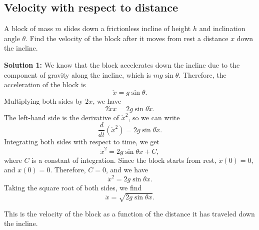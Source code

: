 \documentclass[12pt]{article}
\begin{document}
\subsection{Velocity with respect to distance}
A block of mass $m$ slides down a frictionless incline of height $h$ and inclination angle $\theta$. Find the velocity of the block after it moves from rest a distance $x$ down the incline.

\textbf{Solution 1:}
We know that the block accelerates down the incline due to the component of gravity along the incline, which is $mg\sin\theta$. Therefore, the acceleration of the block is
\begin{equation}
    \ddot{x} = g\sin\theta.
\end{equation}
Multiplying both sides by $2\dot{x}$, we have
\begin{equation}
    2\dot{x}\ddot{x} = 2g\sin\theta\dot{x}.
\end{equation}
The left-hand side is the derivative of $\dot{x}^2$, so we can write
\begin{equation}
    \frac{d}{dt}(\dot{x}^2) = 2g\sin\theta\dot{x}.
\end{equation}
Integrating both sides with respect to time, we get
\begin{equation}
    \dot{x}^2 = 2g\sin\theta x + C,
\end{equation}
where $C$ is a constant of integration. Since the block starts from rest, $\dot{x}(0) = 0$, and $x(0) = 0$. Therefore, $C = 0$, and we have
\begin{equation}
    \dot{x}^2 = 2g\sin\theta x.
\end{equation}
Taking the square root of both sides, we find
\begin{equation}
    \boxed{\dot{x} = \sqrt{2g\sin\theta x}}.
\end{equation}

This is the velocity of the block as a function of the distance it has traveled down the incline.
\end{document}
